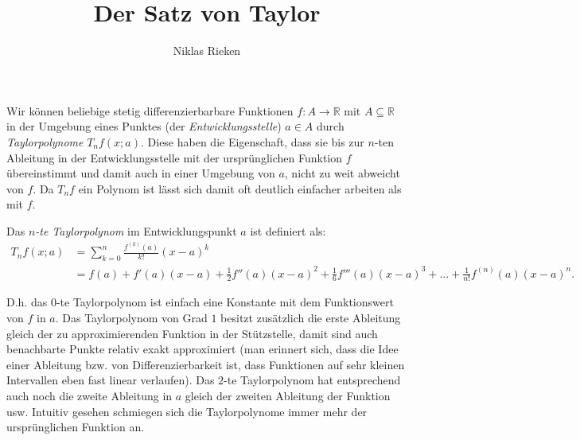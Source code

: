 \documentclass[12pt]{article}
\title{Der Satz von Taylor}
\author{Niklas Rieken}
\begin{document}
\maketitle

Wir können beliebige stetig differenzierbarbare Funktionen $f\colon A \to \mathbb{R}$ mit $A \subseteq \mathbb{R}$ in der Umgebung eines Punktes (der \emph{Entwicklungsstelle}) $a \in A$ durch \emph{Taylorpolynome} $T_nf(x; a)$. Diese haben die Eigenschaft, dass sie bis zur $n$-ten Ableitung in der Entwicklungsstelle mit der ursprünglichen Funktion $f$ übereinstimmt und damit auch in einer Umgebung von $a$, nicht zu weit abweicht von $f$. Da $T_nf$ ein Polynom ist lässt sich damit oft deutlich einfacher arbeiten als mit $f$.

Das \emph{$n$-te Taylorpolynom} im Entwicklungspunkt $a$ ist definiert als:
\begin{align*}
	T_nf(x; a) &= \sum_{k=0}^n \frac{f^{(k)}(a)}{k!} (x-a)^k\\
	&= f(a) + f'(a) (x-a) + \tfrac{1}{2} f''(a) (x-a)^2 + \tfrac{1}{6} f'''(a) (x-a)^3 + \ldots + \tfrac{1}{n!} f^{(n)}(a) (x-a)^n.
\end{align*}

D.h. das $0$-te Taylorpolynom ist einfach eine Konstante mit dem Funktionswert von $f$ in $a$. Das Taylorpolynom von Grad $1$ besitzt zusätzlich die erste Ableitung gleich der zu approximierenden Funktion in der Stützstelle, damit sind auch benachbarte Punkte relativ exakt approximiert (man erinnert sich, dass die Idee einer Ableitung bzw. von Differenzierbarkeit ist, dass Funktionen auf sehr kleinen Intervallen eben fast linear verlaufen). Das $2$-te Taylorpolynom hat entsprechend auch noch die zweite Ableitung in $a$ gleich der zweiten Ableitung der Funktion usw. Intuitiv gesehen schmiegen sich die Taylorpolynome immer mehr der ursprünglichen Funktion an.
\end{document}
